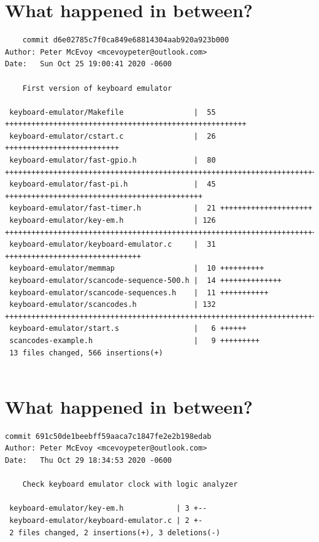 \documentclass{article}
\begin{document}
\newpage

\section*{What happened in between?}
\vspace{2ex}
\begin{verbatim}
    commit d6e02785c7f0ca849e68814304aab920a923b000
Author: Peter McEvoy <mcevoypeter@outlook.com>
Date:   Sun Oct 25 19:00:41 2020 -0600

    First version of keyboard emulator

 keyboard-emulator/Makefile                |  55 +++++++++++++++++++++++++++++++++++++++++++++++++++++++
 keyboard-emulator/cstart.c                |  26 ++++++++++++++++++++++++++
 keyboard-emulator/fast-gpio.h             |  80 ++++++++++++++++++++++++++++++++++++++++++++++++++++++++++++++++++++++++++++++++
 keyboard-emulator/fast-pi.h               |  45 +++++++++++++++++++++++++++++++++++++++++++++
 keyboard-emulator/fast-timer.h            |  21 +++++++++++++++++++++
 keyboard-emulator/key-em.h                | 126 ++++++++++++++++++++++++++++++++++++++++++++++++++++++++++++++++++++++++++++++++++++++++++++++++++++++++++++++++++++++++++++++
 keyboard-emulator/keyboard-emulator.c     |  31 +++++++++++++++++++++++++++++++
 keyboard-emulator/memmap                  |  10 ++++++++++
 keyboard-emulator/scancode-sequence-500.h |  14 ++++++++++++++
 keyboard-emulator/scancode-sequences.h    |  11 +++++++++++
 keyboard-emulator/scancodes.h             | 132 ++++++++++++++++++++++++++++++++++++++++++++++++++++++++++++++++++++++++++++++++++++++++++++++++++++++++++++++++++++++++++++++++++++
 keyboard-emulator/start.s                 |   6 ++++++
 scancodes-example.h                       |   9 +++++++++
 13 files changed, 566 insertions(+)


\end{verbatim}

\newpage

\section*{What happened in between?}
\vspace{2ex}
\begin{verbatim}
commit 691c50de1beebff59aaca7c1847fe2e2b198edab
Author: Peter McEvoy <mcevoypeter@outlook.com>
Date:   Thu Oct 29 18:34:53 2020 -0600

    Check keyboard emulator clock with logic analyzer

 keyboard-emulator/key-em.h            | 3 +--
 keyboard-emulator/keyboard-emulator.c | 2 +-
 2 files changed, 2 insertions(+), 3 deletions(-)


\end{verbatim}
\end{document}

